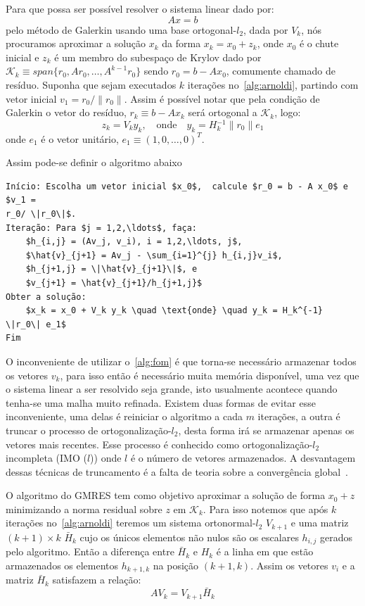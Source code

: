 \documentclass[
	12pt,				  %
	openright,		%
	twoside,			%
	a4paper,			%
	chapter=TITLE,		    %
	english,			%
	brazil				%
	]{abntex2}
\begin{document}
Para que possa ser possível resolver o sistema linear dado por:
\begin{equation}
    Ax = b
\end{equation}
pelo método de Galerkin usando uma base ortogonal-$l_2$, dada por $V_k$, nós
procuramos aproximar a solução $x_k$ da forma $x_k = x_0 + z_k$, onde $x_0$ é o
chute inicial e $z_k$ é um membro do subespaço de Krylov dado por
$\mathcal{K}_k \equiv span\{r_0, Ar_0,\ldots, A^{k-1}r_0\}$ sendo $r_0 = b -
Ax_0$, comumente chamado de resíduo. Suponha que sejam executados $k$ iterações
no~\autoref{alg:arnoldi}, partindo com vetor inicial $v_1 = r_0/\|r_0\|$. Assim
é possível notar que pela condição de Galerkin o vetor do resíduo, $r_k \equiv
b - Ax_k$ será ortogonal a $\mathcal{K}_k$, logo:
\begin{equation}
    z_k = V_k y_k,\quad \text{onde} \quad y_k = H{_k^{-1}}\|r_{0}\|e_1
\end{equation}
onde $e_1$ é o vetor unitário, $e_1 \equiv {(1,0,\ldots,0)}^T$.

Assim pode-se definir o algoritmo abaixo
\begin{lstlisting}[caption = Método da Ortogonalização Completa, fontadjust,
label= alg:fom]
Início: Escolha um vetor inicial $x_0$,  calcule $r_0 = b - A x_0$ e $v_1 =
r_0/ \|r_0\|$.
Iteração: Para $j = 1,2,\ldots$, faça:
    $h_{i,j} = (Av_j, v_i), i = 1,2,\ldots, j$,
    $\hat{v}_{j+1} = Av_j - \sum_{i=1}^{j} h_{i,j}v_i$,
    $h_{j+1,j} = \|\hat{v}_{j+1}\|$, e
    $v_{j+1} = \hat{v}_{j+1}/h_{j+1,j}$
Obter a solução:
    $x_k = x_0 + V_k y_k \quad \text{onde} \quad y_k = H_k^{-1} \|r_0\| e_1$
Fim
\end{lstlisting}

O inconveniente de utilizar o~\autoref{alg:fom} é que torna-se necessário
armazenar todos os vetores $v_k$, para isso então é necessário muita memória
disponível, uma vez que o sistema linear a ser resolvido seja grande, isto
usualmente acontece quando tenha-se uma malha muito refinada. Existem duas
formas de evitar esse inconveniente, uma delas é reiniciar o algoritmo a cada
$m$ iterações, a outra é truncar o processo de ortogonalização-$l_2$, desta
forma irá se armazenar apenas os vetores mais recentes. Esse processo é conhecido como
ortogonalização-$l_2$ incompleta (IMO ($l$)) onde $l$ é o número de vetores
armazenados. A desvantagem dessas técnicas de truncamento é a falta de teoria
sobre a convergência global~\cite{saad1986}.

O algoritmo do GMRES tem como objetivo aproximar a solução de forma
$x_0 + z$ minimizando a norma residual sobre $z$ em $\mathcal{K}_k$. Para isso
notemos que após $k$ iterações no~\autoref{alg:arnoldi} teremos um sistema
ortonormal-$l_2$ $V_{k+1}$ e uma matriz $(k+1)\times k$ $\bar{H}_k$ cujo os
únicos elementos não nulos são os escalares $h_{i,j}$ gerados pelo algoritmo.
Então a diferença entre $\bar{H}_k$ e $H_k$ é a linha em que estão armazenados
os elementos $h_{k+1,k}$ na posição $(k+1,k)$. Assim os vetores $v_i$ e a
matriz $\bar{H}_k$ satisfazem a relação:
\begin{equation}
    A V_k = V_{k+1} \bar{H}_k
\end{equation}
\end{document}

